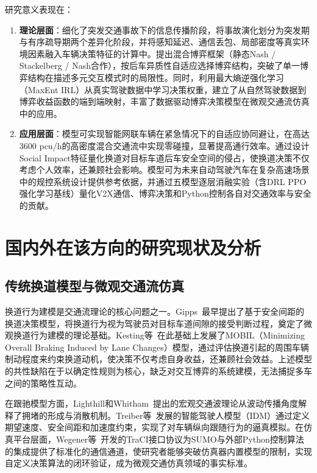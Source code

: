 研究意义表现在：
\begin{enumerate}
    \item \textbf{理论层面}：细化了突发交通事故下的信息传播阶段，将事故演化划分为突发期与有序疏导期两个差异化阶段，并将感知延迟、通信丢包、局部密度等真实环境因素融入车辆决策特征的计算中。提出混合博弈框架（静态Nash / Stackelberg / Nash合作），按后车异质性自适应选择博弈结构，突破了单一博弈结构在描述多元交互模式时的局限性。同时，利用最大熵逆强化学习（MaxEnt IRL）从真实驾驶数据中学习决策权重，建立了从自然驾驶数据到博弈收益函数的端到端映射，丰富了数据驱动博弈决策模型在微观交通流仿真中的应用。
    \item \textbf{应用层面}：模型可实现智能网联车辆在紧急情况下的自适应协同避让，在高达3600 pcu/h的高密度混合交通流中实现零碰撞，显著提高通行效率。通过设计Social Impact特征量化换道对目标车道后车安全空间的侵占，使换道决策不仅考虑个人效率，还兼顾社会影响。模型可为未来自动驾驶汽车在复杂高速场景中的规控系统设计提供参考依据，并通过五模型逐层消融实验（含DRL PPO强化学习基线）量化V2X通信、博弈决策和Python控制各自对交通效率与安全的贡献。
\end{enumerate}

\section{国内外在该方向的研究现状及分析}

\subsection{传统换道模型与微观交通流仿真}
换道行为建模是交通流理论的核心问题之一。Gipps~\cite{gipps1986model}最早提出了基于安全间距的换道决策模型，将换道行为视为驾驶员对目标车道间隙的接受判断过程，奠定了微观换道行为建模的理论基础。Kesting等~\cite{kesting2007general}在此基础上发展了MOBIL（Minimizing Overall Braking Induced by Lane Changes）模型，通过评估换道引起的周围车辆制动程度来约束换道动机，使决策不仅考虑自身收益，还兼顾社会效益。上述模型的共性缺陷在于以确定性规则为核心，缺乏对交互博弈的系统建模，无法捕捉多车之间的策略性互动。

在跟驰模型方面，Lighthill和Whitham~\cite{lighthill1955kinematic}提出的宏观交通波理论从波动传播角度解释了拥堵的形成与消散机制。Treiber等~\cite{treiber2000congested}发展的智能驾驶人模型（IDM）通过定义期望速度、安全间距和加速度约束，实现了对车辆纵向跟随行为的逼真模拟。在仿真平台层面，Wegener等~\cite{wegener2008traci}开发的TraCI接口协议为SUMO与外部Python控制算法的集成提供了标准化的通信通道，使研究者能够突破仿真器内置模型的限制，实现自定义决策算法的闭环验证，成为微观交通仿真领域的事实标准。

